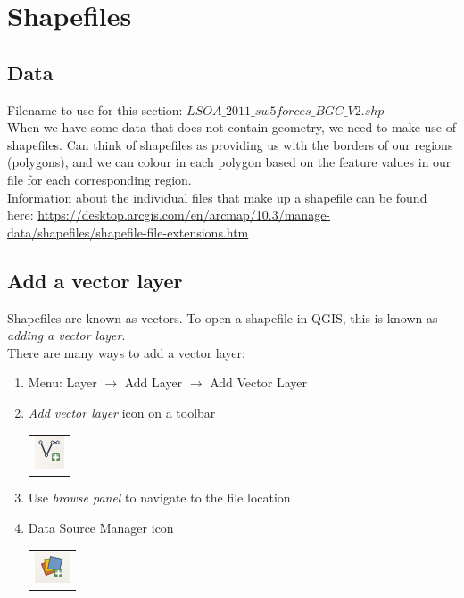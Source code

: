 \chapter{Shapefiles}

\pagestyle{fancy}
\fancyhf{}
\fancyhead[OC]{\leftmark}
\fancyhead[EC]{\rightmark}
\cfoot{\thepage}


\section{Data}

Filename to use for this section: $LSOA\_2011\_sw5forces\_BGC\_V2.shp$\\

When we have some data that does not contain geometry, we need to make use of shapefiles. Can think of shapefiles as providing us with the borders of our regions (polygons), and we can colour in each polygon based on the feature values in our file for each corresponding region.\\

Information about the individual files that make up a shapefile can be found here: \url{https://desktop.arcgis.com/en/arcmap/10.3/manage-data/shapefiles/shapefile-file-extensions.htm}\\

\section{Add a vector layer}

Shapefiles are known as vectors. To open a shapefile in QGIS, this is known as \textit{adding a vector layer}.\\

There are many ways to add a vector layer:
\begin{enumerate}[~~~1)]
	\item
	Menu: Layer $\rightarrow$ Add Layer $\rightarrow$ Add Vector Layer

	\item 
	\textit{Add vector layer} icon on a toolbar
	\begin{tabular}{@{}c@{}}\includegraphics[width=4ex]{images/add_vector_layer_icon.png}\end{tabular}
		
	\item 
	Use \textit{browse panel} to navigate to the file location

	\item 
	Data Source Manager icon
	\begin{tabular}{@{}c@{}}\includegraphics[width=4ex]{images/data_source_manager_icon.png}\end{tabular}

	
\end{enumerate}

